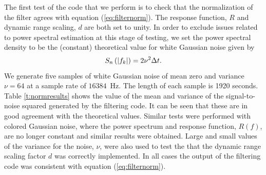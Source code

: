 The first test of the code that we perform is to check that the normalization
of the filter agrees with equation (\ref{eq:filternorm}). The response
function, $R$ and dynamic range scaling, $d$ are both set to unity. In order
to exclude issues related to power spectral estimation at this stage of
testing, we set the power spectral density to be the (constant) theoretical
value for white Gaussian noise given by
\begin{equation}
S_n\left(\left|f_{k}\right|\right) = 2 \nu^2 \Delta t.
\label{eq:gaussianpsd}
\end{equation}
We generate five samples of white Gaussian noise of mean zero and variance
$\nu = 64$ at a sample rate of $16384$~Hz. The length of each sample is 1920
seconds. Table \ref{t:normresults} shows the value of the mean and variance of
the signal-to-noise squared generated by the filtering code. It can be seen 
that these are in good agreement with the theoretical values. Similar tests
were performed with colored Gaussian noise, where the power spectrum and
response function, $R(f)$, are no longer constant and similar results were
obtained. Large and small values of the variance for the noise, $\nu$, were
also used to test the that the dynamic range scaling factor $d$ was correctly
implemented. In all cases the output of the filtering code was consistent with
equation (\ref{eq:filternorm}).

